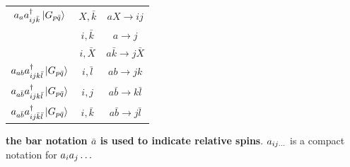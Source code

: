 \documentclass[./thesis.tex]{subfiles}
\begin{document}
\begin{table}
\begin{center}
\begin{tabular}{ c|c|c }
											
		\hline \rule{0pt}{3ex}
		$a_{a} a^\dagger_{ij \bar k} \ket {G_{p \bar q}}$		&$X,\bar k$		&$aX \rightarrow ij$		\\
											&$i,\bar k$		&$a \rightarrow j$		\\
											&$i,\bar X$		&$a \bar k \rightarrow j \bar X$		\\
											
		\hline \rule{0pt}{3ex}
		$a_{ab} a^\dagger_{ijk \bar l} \ket {G_{p \bar q}}$			&$i,\bar l$		&$ab \rightarrow jk$		\\
		\hline \rule{0pt}{3ex}
		$a_{a  \bar b} a^\dagger_{ijk \bar l} \ket {G_{p \bar q}}$			&$i,j$		&$a \bar b \rightarrow k \bar l$		\\
		\hline \rule{0pt}{3ex}
		$a_{a  \bar b} a^\dagger_{ij \bar k \bar l} \ket {G_{p \bar q}}$			&$i,\bar k$		&$a \bar b \rightarrow j \bar l$		\\
	\end{tabular}
	
\end{center}
\textbf{the bar notation $\bar a$ is used to indicate relative spins}. $a_{ij\ldots}$ is a compact notation for $a_{i} a_{j} \ldots$
\end{table}
\end{document}
